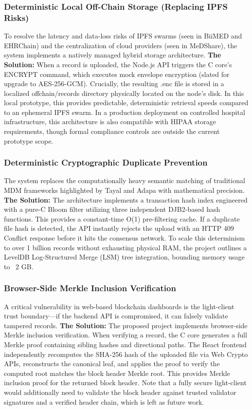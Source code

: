 \documentclass[12pt]{article}
\begin{document}
\subsubsection{Deterministic Local Off-Chain Storage (Replacing IPFS Risks)}
To resolve the latency and data-loss risks of IPFS swarms (seen in BiiMED and EHRChain) and the centralization of cloud providers (seen in MeDShare), the system implements a natively managed hybrid storage architecture.
\textbf{The Solution:} When a record is uploaded, the Node.js API triggers the C core's ENCRYPT command, which executes mock envelope encryption (slated for upgrade to AES-256-GCM). Crucially, the resulting .enc file is stored in a localized offchain/records directory physically located on the node's disk. In this local prototype, this provides predictable, deterministic retrieval speeds compared to an ephemeral IPFS swarm. In a production deployment on controlled hospital infrastructure, this architecture is also compatible with HIPAA storage requirements, though formal compliance controls are outside the current prototype scope.

\subsubsection{Deterministic Cryptographic Duplicate Prevention}
The system replaces the computationally heavy semantic matching of traditional MDM frameworks highlighted by Tayal and Adapa with mathematical precision.
\textbf{The Solution:} The architecture implements a transaction hash index engineered with a pure-C Bloom filter utilizing three independent DJB2-based hash functions. This provides a constant-time O(1) pre-filtering cache. If a duplicate file hash is detected, the API instantly rejects the upload with an HTTP 409 Conflict response before it hits the consensus network. To scale this determinism to over 1 billion records without exhausting physical RAM, the project outlines a LevelDB Log-Structured Merge (LSM) tree integration, bounding memory usage to ~2 GB.

\subsubsection{Browser-Side Merkle Inclusion Verification}
A critical vulnerability in web-based blockchain dashboards is the light-client trust boundary—if the backend API is compromised, it can falsely validate tampered records.
\textbf{The Solution:} The proposed project implements browser-side Merkle inclusion verification. When verifying a record, the C core generates a full Merkle proof containing sibling hashes and directional paths. The React frontend independently recomputes the SHA-256 hash of the uploaded file via Web Crypto APIs, reconstructs the canonical leaf, and applies the proof to verify the computed root matches the block header Merkle root. This provides Merkle inclusion proof for the returned block header. Note that a fully secure light-client would additionally need to validate the block header against trusted validator signatures and a verified header chain, which is left as future work.
\end{document}
